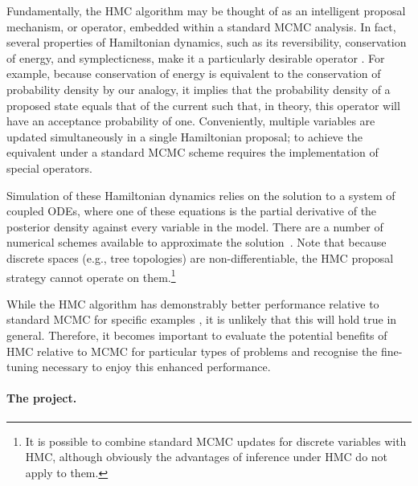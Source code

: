 \documentclass{article}
\begin{document}
    Fundamentally, the \ac{HMC} algorithm may be thought of as an intelligent
        proposal mechanism, or operator, embedded within a standard \ac{MCMC}
        analysis.
    In fact, several properties of Hamiltonian dynamics, such as its
        reversibility, conservation of energy, and symplecticness, make it a
        particularly desirable operator \cite{Nea11}.
    For example, because conservation of energy is equivalent to the
        conservation of probability density by our analogy, it implies that the
        probability density of a proposed state equals that of the current
        such that, in theory, this operator will have an acceptance probability
        of one.
    Conveniently, multiple variables are updated simultaneously in a single
        Hamiltonian proposal; to achieve the equivalent under a standard
        \ac{MCMC} scheme requires the implementation of special operators.

    Simulation of these Hamiltonian dynamics relies on the solution to a system
        of coupled \acp{ODE}, where one of these equations is the partial
        derivative of the posterior density against every variable in the
        model.
    There are a number of numerical schemes available to approximate the
        solution~\cite{Nea11}.
    Note that because discrete spaces (e.g., tree topologies) are
        non-differentiable, the \ac{HMC} proposal strategy cannot operate on
        them.\footnote{It is possible to combine standard \ac{MCMC} updates for
        discrete variables with \ac{HMC}, although obviously the advantages of
        inference under \ac{HMC} do not apply to them.}

    While the \ac{HMC} algorithm has demonstrably better performance relative
        to standard \ac{MCMC} for specific examples \cite{Nea11}, it is
        unlikely that this will hold true in general.
    Therefore, it becomes important to evaluate the potential benefits of
        \ac{HMC} relative to \ac{MCMC} for particular types of problems and
        recognise the fine-tuning necessary to enjoy this enhanced performance.

    \paragraph*{The project.}
\end{document}
